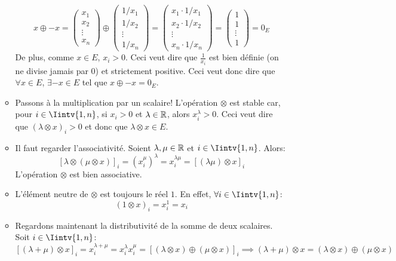 \begin{exercice}
\begin{enumerate}
\begin{itemize}
        $$x \oplus -x = \begin{pmatrix}
            x_1 \\ x_2 \\ \vdots \\ x_n
        \end{pmatrix} \oplus 
        \begin{pmatrix}
            1/x_1 \\ 1/x_2 \\ \vdots \\ 1/x_n
        \end{pmatrix} =
        \begin{pmatrix}
            x_1 \cdot 1/x_1 \\ x_2 \cdot 1/x_2 \\ \vdots \\ x_n \cdot 1/x_n
        \end{pmatrix} =
        \begin{pmatrix}
            1 \\ 1 \\ \vdots \\ 1
        \end{pmatrix} = 0_E$$
        De plus, comme $x \in E$, $x_i > 0$. Ceci veut dire que $\frac{1}{x_i}$ est bien définie (on ne divise jamais par $0$) et strictement positive. Ceci veut donc dire que $\forall x \in E$, $\exists -x \in E$ tel que $x \oplus -x = 0_E$.
        \item Passons à la multiplication par un scalaire! L'opération $\otimes$ est stable car, pour $i \in \Iintv{1,n}$, si $x_i > 0$ et $\lambda \in \mathbb{R}$, alors $x_i ^\lambda > 0$. Ceci veut dire que $(\lambda \otimes x)_i > 0$ et donc que $\lambda \otimes x \in E$.
        \item Il faut regarder l'associativité. Soient $\lambda, \mu \in \mathbb{R}$ et $i \in \Iintv{1,n}$. Alors:
        $$[\lambda \otimes (\mu \otimes x)]_i = (x_i ^ \mu) ^ \lambda = x_i ^{\lambda \mu} = [(\lambda \mu) \otimes x]_i$$
        L'opération $\otimes$ est bien associative.
        \item L'élément neutre de $\otimes$ est toujours le réel $1$. En effet, $\forall i \in \Iintv{1,n}$:
        $$(1 \otimes x)_i = x_i ^ 1 = x_i$$
        \item Regardons maintenant la distributivité de la somme de deux scalaires. Soit $i \in \Iintv{1,n}$:
        $$[(\lambda + \mu) \otimes x]_i = x_i ^{\lambda + \mu} = x_i^\lambda x_i^\mu = [(\lambda \otimes x) \oplus (\mu \otimes x)]_i \implies (\lambda + \mu) \otimes x = (\lambda \otimes x) \oplus (\mu \otimes x)$$

\end{itemize}
\end{enumerate}
\end{exercice}
